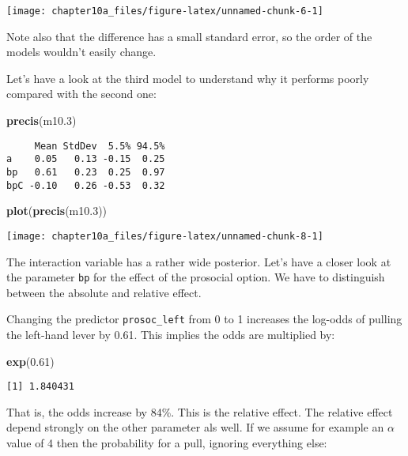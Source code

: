 \documentclass[]{tufte-handout}
\newenvironment{Shaded}{}{}
\newcommand{\KeywordTok}[1]{\textcolor[rgb]{0.00,0.44,0.13}{\textbf{#1}}}
\newcommand{\FloatTok}[1]{\textcolor[rgb]{0.25,0.63,0.44}{#1}}
\newcommand{\NormalTok}[1]{#1}
\begin{document}
\texttt{[image: chapter10a\_files/figure-latex/unnamed-chunk-6-1]}

Note also that the difference has a small standard error, so the order
of the models wouldn't easily change.

Let's have a look at the third model to understand why it performs
poorly compared with the second one:

\begin{Shaded}
\begin{Highlighting}[]
\KeywordTok{precis}\NormalTok{(m10}\FloatTok{.3}\NormalTok{)}
\end{Highlighting}
\end{Shaded}

\begin{verbatim}
     Mean StdDev  5.5% 94.5%
a    0.05   0.13 -0.15  0.25
bp   0.61   0.23  0.25  0.97
bpC -0.10   0.26 -0.53  0.32
\end{verbatim}

\begin{Shaded}
\begin{Highlighting}[]
\KeywordTok{plot}\NormalTok{(}\KeywordTok{precis}\NormalTok{(m10}\FloatTok{.3}\NormalTok{))}
\end{Highlighting}
\end{Shaded}

\texttt{[image: chapter10a\_files/figure-latex/unnamed-chunk-8-1]}

The interaction variable has a rather wide posterior. Let's have a
closer look at the parameter \texttt{bp} for the effect of the prosocial
option. We have to distinguish between the absolute and relative effect.

Changing the predictor \texttt{prosoc\_left} from 0 to 1 increases the
log-odds of pulling the left-hand lever by 0.61. This implies the odds
are multiplied by:

\begin{Shaded}
\begin{Highlighting}[]
\KeywordTok{exp}\NormalTok{(}\FloatTok{0.61}\NormalTok{)}
\end{Highlighting}
\end{Shaded}

\begin{verbatim}
[1] 1.840431
\end{verbatim}

That is, the odds increase by 84\%. This is the relative effect. The
relative effect depend strongly on the other parameter als well. If we
assume for example an \(\alpha\) value of 4 then the probability for a
pull, ignoring everything else:
\end{document}

